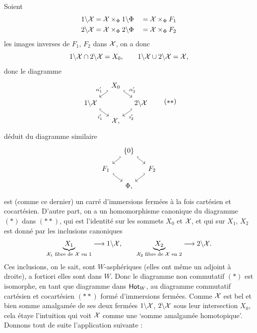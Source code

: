 Soient
\[
\begin{aligned}
1\backslash\mathcal{X} &= \mathcal{X}\times_{\Phi} 1\backslash\Phi &&= \mathcal{X}\times_{\Phi} F_1\\
2\backslash\mathcal{X} &= \mathcal{X}\times_{\Phi} 2\backslash\Phi &&= \mathcal{X}\times_{\Phi} F_2
\end{aligned}
\]
les images inverses de $F_1$, $F_2$ dans $\mathcal{X}$, on a donc
\[
1\backslash\mathcal{X}\cap 2\backslash\mathcal{X} = X_0, \qquad 1\backslash\mathcal{X}\cup 2\backslash\mathcal{X} = \mathcal{X},
\]
donc le diagramme
\[
\begin{tikzcd}[column sep=small, row sep=small, ampersand replacement=\&]
 \& X_0 \arrow[dl, hook', "\alpha'_1"'] \arrow[dr, hook, "\alpha'_2"] \& \\
1\backslash\cX \arrow[dr, hook, "i'_1"'] \& \& 2\backslash\cX \arrow[dl, hook', "i'_2"] \\
 \& \cX, \&
\end{tikzcd}
\tag*{$(**)$}
\]
déduit du diagramme similaire
\[
\begin{tikzcd}[column sep=small, row sep=small, ampersand replacement=\&]
 \& \{0\} \arrow[dl, hook'] \arrow[dr, hook] \& \\
F_1 \arrow[dr, hook] \& \& F_2 \arrow[dl, hook'] \\
 \& \Phi, \&
\end{tikzcd}
\]
est (comme ce dernier) un carré d'immersions fermées à la fois cartésien et cocartésien. D'autre part, on a un homomorphisme
canonique du diagramme $(*)$ dans $(**)$, qui est l'identité sur les sommets $X_0$ et $\mathcal{X}$, et qui sur $X_1$, $X_2$ est donné par les inclusions canoniques
\[
\underbrace{X_1}_{\text{\scriptsize $\mathcal{X}_1$ fibre de $\mathcal{X}$ en 1}} \longrightarrow 1\backslash\mathcal{X}, \qquad
\underbrace{X_2}_{\text{\scriptsize $\mathcal{X}_2$ fibre de $\mathcal{X}$ en 2}} \longrightarrow 2\backslash\mathcal{X}.
\]
Ces inclusions, on le sait, sont $W$-asphériques (elles ont même un adjoint à droite), a fortiori elles sont dans $W$. Donc le diagramme non commutatif $(*)$ est isomorphe, en tant que diagramme dans $\mathsf{Hot}_W$, au diagramme commutatif cartésien et cocartésien $(**)$ formé d'immersions fermées. Comme $\mathcal{X}$ est bel et bien somme amalgamée de ses deux fermées %
$1\backslash\mathcal{X}$, $2\backslash\mathcal{X}$ sous leur intersection $X_0$, cela étaye l'intuition qui voit $\mathcal{X}$ comme une `somme amalgamée homotopique'. Donnons tout de suite l'application suivante :

